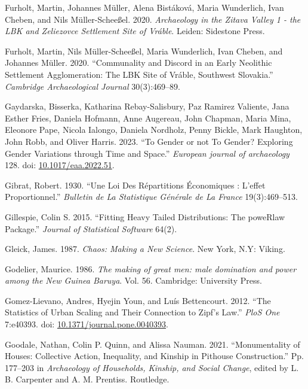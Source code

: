 \documentclass[
  12pt,
]{book}
\newlength{\cslhangindent}
\newlength{\cslentryspacingunit} %
\newenvironment{CSLReferences}[2] %
 {%
  \setlength{\parindent}{0pt}
  \ifodd #1
  \let\oldpar\par
  \def\par{\hangindent=\cslhangindent\oldpar}
  \fi
  \setlength{\parskip}{#2\cslentryspacingunit}
 }%
 {}
\begin{document}
\begin{CSLReferences}{1}{0}
\leavevmode{}%
Furholt, Martin, Johannes Müller, Alena Bistáková, Maria Wunderlich, Ivan Cheben, and Nils Müller-Scheeßel. 2020. \emph{Archaeology in the Zitava Valley 1 - the LBK and Zeliezovce Settlement Site of Vráble}. Leiden: Sidestone Press.

\leavevmode{}%
Furholt, Martin, Nils Müller-Scheeßel, Maria Wunderlich, Ivan Cheben, and Johannes Müller. 2020. {``Communality and Discord in an Early Neolithic Settlement Agglomeration: The LBK Site of Vráble, Southwest Slovakia.''} \emph{Cambridge Archaeological Journal} 30(3):469--89.

\leavevmode{}%
Gaydarska, Bisserka, Katharina Rebay-Salisbury, Paz Ramirez Valiente, Jana Esther Fries, Daniela Hofmann, Anne Augereau, John Chapman, Maria Mina, Eleonore Pape, Nicola Ialongo, Daniela Nordholz, Penny Bickle, Mark Haughton, John Robb, and Oliver Harris. 2023. {``To Gender or not To Gender? Exploring Gender Variations through Time and Space.''} \emph{European journal of archaeology} 128. doi: \href{https://doi.org/10.1017/eaa.2022.51}{10.1017/eaa.2022.51}.

\leavevmode{}%
Gibrat, Robert. 1930. {``Une Loi Des Répartitions Économiques : L'effet Proportionnel.''} \emph{Bulletin de La Statistique Générale de La France} 19(3):469--513.

\leavevmode{}%
Gillespie, Colin S. 2015. {``Fitting Heavy Tailed Distributions: The poweRlaw Package.''} \emph{Journal of Statistical Software} 64(2).

\leavevmode{}%
Gleick, James. 1987. \emph{Chaos: Making a New Science}. {New York, N.Y}: {Viking}.

\leavevmode{}%
Godelier, Maurice. 1986. \emph{The making of great men: male domination and power among the New Guinea Baruya}. Vol. 56. Cambridge: University Press.

\leavevmode{}%
Gomez-Lievano, Andres, Hyejin Youn, and Luís Bettencourt. 2012. {``The Statistics of Urban Scaling and Their Connection to Zipf{'}s Law.''} \emph{PloS One} 7:e40393. doi: \href{https://doi.org/10.1371/journal.pone.0040393}{10.1371/journal.pone.0040393}.

\leavevmode{}%
Goodale, Nathan, Colin P. Quinn, and Alissa Nauman. 2021. {``Monumentality of Houses: {Collective} Action, Inequality, and Kinship in Pithouse Construction.''} Pp. 177--203 in \emph{Archaeology of {Households}, {Kinship}, and {Social Change}}, edited by L. B. Carpenter and A. M. Prentiss. {Routledge}.


\end{CSLReferences}
\end{document}
